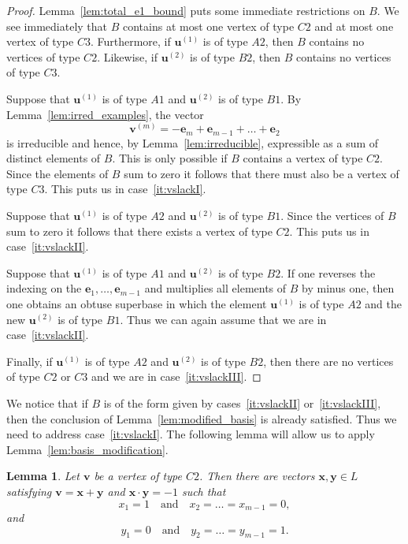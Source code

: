\documentclass{amsart} %
\newcommand{\e}{\bm{e}}
\newcommand{\bv}{\bm{v}}
\newcommand{\bu}{\bm{u}}
\theoremstyle{thm}
\newtheorem{lem}[Theorem]{Lemma}
\theoremstyle{definition}
\numberwithin{equation}{section}
\begin{document}
\begin{proof}
Lemma~\ref{lem:total_e1_bound} puts some immediate restrictions on $B$. We see immediately that $B$ contains at most one vertex of type $C2$ and at most one vertex of type $C3$. Furthermore,  if $\bu^{(1)}$ is of type $A2$, then $B$ contains no vertices of type $C2$. Likewise, if $\bu^{(2)}$ is of type $B2$, then $B$ contains no vertices of type $C3$.

Suppose that $\bu^{(1)}$ is of type $A1$ and $\bu^{(2)}$ is of type $B1$. By Lemma~\ref{lem:irred_examples}, the vector
\[
\bv^{(m)}=-\e_m+\e_{m-1}+\dots + \e_2
\]
is irreducible and hence, by Lemma~\ref{lem:irreducible}, expressible as a sum of distinct elements of $B$. This is only possible if $B$ contains a vertex of type $C2$. Since the elements of $B$ sum to zero it follows that there must also be a vertex of type $C3$. This puts us in case~\ref{it:vslackI}.

Suppose that $\bu^{(1)}$ is of type $A2$ and $\bu^{(2)}$ is of type $B1$. Since the vertices of $B$ sum to zero it follows that there exists a vertex of type $C2$. This puts us in case~\ref{it:vslackII}.

Suppose that $\bu^{(1)}$ is of type $A1$ and $\bu^{(2)}$ is of type $B2$. If one reverses the indexing on the $\e_1, \dots, \e_{m-1}$ and multiplies all elements of $B$ by minus one, then one obtains an obtuse superbase in which the element $\bu^{(1)}$ is of type $A2$ and the new $\bu^{(2)}$ is of type $B1$. Thus we can again assume that we are in case~\ref{it:vslackII}.

Finally, if $\bu^{(1)}$ is of type $A2$ and $\bu^{(2)}$ is of type $B2$, then there are no vertices of type $C2$ or $C3$ and we are in case~\ref{it:vslackIII}.
\end{proof}
We notice that if $B$ is of the form given by cases~\ref{it:vslackII} or~\ref{it:vslackIII}, then the conclusion of Lemma~\ref{lem:modified_basis} is already satisfied. Thus we need to address case~\ref{it:vslackI}. The following lemma will allow us to apply Lemma~\ref{lem:basis_modification}.
\begin{lem}\label{lem:typeC2_splitting}
Let $\bv$ be a vertex of type $C2$. Then there are vectors $\bm{x},\bm{y}\in L$ satisfying $\bv=\bm{x}+\bm{y}$ and $\bm{x}\cdot \bm{y} =-1$ such that
\[x_1 = 1 \quad \text{and}\quad x_2 = \dots = x_{m-1}=0,
\]
and
\[y_1 = 0 \quad \text{and}\quad y_2 = \dots = y_{m-1}=1.
\]
\end{lem}
\end{document}
